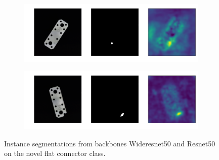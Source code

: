 
\begin{figure}[htbp]
    \centering
    \begin{subfigure}[b]{0.4\textwidth}
        \includegraphics[width=\textwidth]{figures/backboneexamples/flat_connector_test_logical_anomalies_033.png}

    \end{subfigure}
    \begin{subfigure}[b]{0.4\textwidth}
        \includegraphics[width=\textwidth]{figures/backboneexamples/flat_connector_test_structural_anomalies_001.png}

    \end{subfigure}
    \caption{Instance segmentations from backbones Wideresnet50 \cite{wideresnet} and Resnet50 \cite{He_2016resnet} on the novel flat connector class.}
    \label{fig:faillayersegments}
\end{figure}
